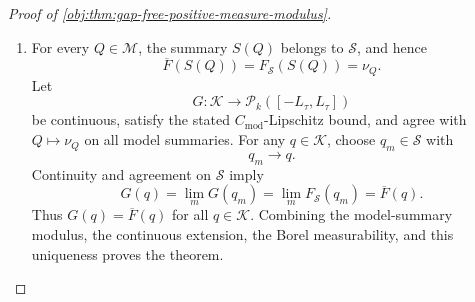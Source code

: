 \begin{proof}[Proof of \cref{obj:thm:gap-free-positive-measure-modulus}]
\begin{enumerate}
It remains to transfer the sharper \(d_S\)-control.  Fix \(q,q'\in\mathcal K\).  Choose sequences \(q_m,q'_m\in\mathscr S\) converging in the ambient metric to \(q,q'\), respectively.  Continuity of \(\overline F\) and \cref{obj:lem:summary-metric-continuity} give
\[
W_1(\overline F(q_m),\overline F(q'_m))
\longrightarrow
W_1(\overline F(q),\overline F(q')),
\qquad
d_S(q_m,q'_m)\longrightarrow d_S(q,q').
\]
For every \(m\), agreement on \(\mathscr S\) and the model-summary control in \cref{eq:gap-free-model-summary-control} yield
\[
W_1(\overline F(q_m),\overline F(q'_m))
=
W_1(F_{\mathscr S}(q_m),F_{\mathscr S}(q'_m))
\le
C_{\mathrm{mod}}d_S(q_m,q'_m).
\]
Passing to the limit proves
\[
W_1(\overline F(q),\overline F(q'))
\le
C_{\mathrm{mod}}d_S(q,q')
\qquad(q,q'\in\mathcal K).
\]
Continuity of \(\overline F\), together with the Borel structure on the quotient atomic-law space, makes \(\overline F\) Borel measurable.

\item For every \(Q\in\mathcal M\), the summary \(S(Q)\) belongs to \(\mathscr S\), and hence
\[
\overline F(S(Q))
=
F_{\mathscr S}(S(Q))
=
\nu_Q .
\]
Let
\[
G:\mathcal K\to\mathcal P_k([-L_\tau,L_\tau])
\]
be continuous, satisfy the stated \(C_{\mathrm{mod}}\)-Lipschitz bound, and agree with \(Q\mapsto\nu_Q\) on all model summaries.  For any \(q\in\mathcal K\), choose \(q_m\in\mathscr S\) with
\[
q_m\to q .
\]
Continuity and agreement on \(\mathscr S\) imply
\[
G(q)
=
\lim_m G(q_m)
=
\lim_m F_{\mathscr S}(q_m)
=
\overline F(q).
\]
Thus \(G(q)=\overline F(q)\) for all \(q\in\mathcal K\).  Combining the model-summary modulus, the continuous extension, the Borel measurability, and this uniqueness proves the theorem.
\end{enumerate}
\end{proof}

